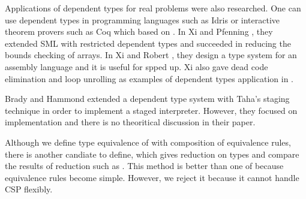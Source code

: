 
Applications of dependent types for real problems were also researched.
One can use dependent types in programming languages such as Idris\cite{brady2013idris} or
interactive theorem provers such as Coq\cite{09thecoq} which based on \cite{coquand:inria-00076024}.
In Xi and Pfenning \cite{Xi98}, they extended SML with restricted dependent types
and succeeded in reducing the bounds checking of arrays.
In Xi and Robert \cite{xi2001dependently}, they design a type system for an assembly language and
it is useful for spped up.
Xi also gave dead code elimination and loop unrolling as examples of dependent types application in \cite{xi1999dependent}.


Brady and Hammond \cite{brady2006dependently} extended a dependent type system 
with Taha's staging technique \cite{taha2007gentle} in order to implement a staged interpreter.
However, they focused on implementation and there is no theoritical discussion in their paper.


Although we define type equivalence of \LMD with composition of equivalence rules,
there is another candiate to define,
which gives reduction on types and compare the results of reduction such as \cite{sorensen2006lectures}.
This method is better than one of \LMD because equivalence rules become simple.
However, we reject it because it cannot handle CSP flexibly.
